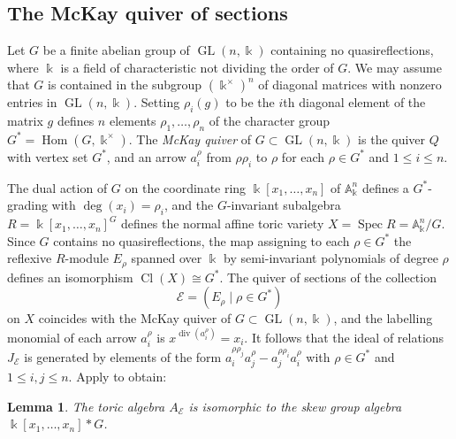 \documentclass[11pt,a4paper]{amsart}
\numberwithin{equation}{section}
\newtheorem{lemma}[theorem]{Lemma}
\theoremstyle{definition}
\theoremstyle{remark}
\newcommand{\kk}{\ensuremath{\Bbbk}}
\renewcommand{\div}{\operatorname{div}}
\newcommand{\Cl}{\operatorname{Cl}}
\newcommand{\GL}{\operatorname{GL}}
\newcommand{\Hom}{\operatorname{Hom}}
\newcommand{\Spec}{\operatorname{Spec}}
\begin{document}
\subsection{The McKay quiver of sections}
Let $G$ be a finite abelian group of $\GL(n,\Bbbk)$ containing no quasireflections, where $\Bbbk$ is a field of characteristic not dividing the order of $G$.  We may assume that $G$ is contained in the subgroup $(\Bbbk^{\times})^n$ of diagonal matrices with nonzero entries in $\GL(n,\kk)$.   Setting $\rho_i(g)$ to be the $i$th diagonal element of the matrix $g$ defines $n$ elements $\rho_1,\dots,\rho_n$ of the character group $G^{*}=\Hom(G,\Bbbk^{\times})$.  The \emph{McKay quiver} of $G\subset \GL(n,\Bbbk)$ is the quiver $Q$ with vertex set $G^{*}$, and an arrow $a^{\rho}_i$ from $\rho\rho_i$ to $\rho$ for each $\rho \in G^{*}$ and $1 \leq i \leq n$.



The dual action of $G$ on the coordinate ring $\kk[x_1,\dots,x_n]$ of $\mathbb{A}^n_\kk$ defines a $G^*$-grading with $\deg(x_i)=\rho_i$, and the $G$-invariant subalgebra $R=\kk[x_1,\dots,x_n]^G$ defines the normal affine toric variety $X=\Spec R = \mathbb{A}_{\Bbbk}^n/G$. Since $G$ contains no quasireflections, the map assigning to each $\rho \in G^{*}$ the reflexive $R$-module $E_\rho$ spanned over $\kk$ by semi-invariant polynomials of degree $\rho$ defines an isomorphism $\Cl(X)\cong G^*$.  The quiver of sections of the collection 
\begin{equation}
\label{eqn:McKaycollection}
\mathscr{E}=(E_{\rho} \mid \rho \in G^{*})
\end{equation}
on $X$ coincides with the McKay quiver of $G\subset \GL(n,\Bbbk)$, and the labelling monomial of each arrow $a_{i}^{\rho}$ is $x^{\div(a_{i}^{\rho})}=x_i$. It follows that the ideal of relations $J_{\mathscr{E}}$ is generated by elements of the form $a_i^{\rho \rho_j}a_j^{\rho}-a_j^{\rho \rho_i}a_i^{\rho}$ with $\rho \in G^{*}$ and $1 \leq i,j \leq n$. Apply \cite[Proposition~2.8]{CMT2} to obtain:

\begin{lemma}
\label{lem:skewgroup}
The toric algebra $A_{\mathscr{E}}$ is isomorphic to the skew group algebra $\Bbbk[x_1,\dots,x_n]\ast G$.
\end{lemma}
\end{document}
